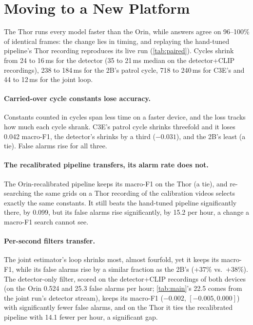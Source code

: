\documentclass[conference]{IEEEtran}
\begin{document}
\section{Moving to a New Platform}
\label{sec:thor}

The Thor runs every model faster than the Orin, while answers agree on 96--100\% of identical frames: the change lies in timing, and replaying the hand-tuned pipeline's Thor recording reproduces its live run (\cref{tab:paired}).  Cycles shrink from 24 to 16\,ms for the detector (35 to 21\,ms median on the detector+CLIP recordings), 238 to 184\,ms for the 2B's patrol cycle, 718 to 240\,ms for C3E's and 44 to 12\,ms for the joint loop.

\paragraph{Carried-over cycle constants lose accuracy.}  Constants counted in cycles span less time on a faster device, and the loss tracks how much each cycle shrank.  C3E's patrol cycle shrinks threefold and it loses 0.042 macro-F1, the detector's shrinks by a third ($-0.031$), and the 2B's least (a tie).  False alarms rise for all three.

\paragraph{The recalibrated pipeline transfers, its alarm rate does not.}  The Orin-recalibrated pipeline keeps its macro-F1 on the Thor (a tie), and re-searching the same grids on a Thor recording of the calibration videos selects exactly the same constants.  It still beats the hand-tuned pipeline significantly there, by 0.099, but its false alarms rise significantly, by 15.2 per hour, a change a macro-F1 search cannot see.

\paragraph{Per-second filters transfer.}  The joint estimator's loop shrinks most, almost fourfold, yet it keeps its macro-F1, while its false alarms rise by a similar fraction as the 2B's ($+37\%$ vs.\ $+38\%$).  The detector-only filter, scored on the detector+CLIP recordings of both devices (on the Orin 0.524 and 25.3 false alarms per hour; \cref{tab:main}'s 22.5 comes from the joint run's detector stream), keeps its macro-F1 ($-0.002$, $[-0.005,0.000]$) with significantly fewer false alarms, and on the Thor it ties the recalibrated pipeline with 14.1 fewer per hour, a significant gap.
\end{document}
